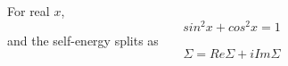 \documentclass{article}
\begin{document}
For real $x$,
\begin{equation}
sin^2x + cos^2x = 1
\label{eq:b1}
\end{equation}
and the self-energy splits as
\begin{equation}
\Sigma = Re\Sigma + i Im\Sigma
\label{eq:b2}
\end{equation}
\end{document}
